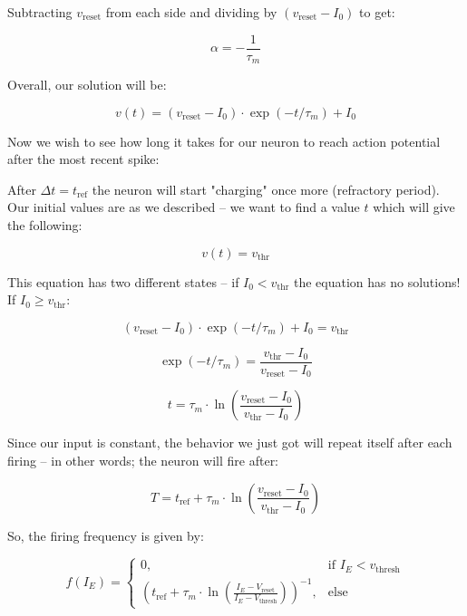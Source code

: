 Subtracting \( v_{\text{reset}} \) from each side and dividing by \( (v_{\text{reset}} - I_0) \) to get:

\begin{equation}
\alpha = -\frac{1}{\tau_m}
\end{equation}

Overall, our solution will be:

\begin{equation} \label{eq:general_sol}
v(t) = (v_{\text{reset}} - I_0) \cdot \exp(-t/\tau_m) + I_0
\end{equation}

Now we wish to see how long it takes for our neuron to reach action potential after the most recent spike:

After \( \Delta t = t_{\text{ref}} \) the neuron will start "charging" once more (refractory period). Our initial values are as we described – we want to find a value \( t \) which will give the following:

\begin{equation}
v(t) = v_{\text{thr}}
\end{equation}

This equation has two different states – if \( I_0 < v_{\text{thr}} \) the equation has no solutions! If \( I_0 \geq v_{\text{thr}} \):

\begin{equation}
(v_{\text{reset}} - I_0) \cdot \exp(-t/\tau_m) + I_0 = v_{\text{thr}}
\end{equation}

\begin{equation}
\exp(-t/\tau_m) = \frac{v_{\text{thr}} - I_0}{v_{\text{reset}} - I_0}
\end{equation}

\begin{equation}
t = \tau_m \cdot \ln\left(\frac{v_{\text{reset}} - I_0}{v_{\text{thr}} - I_0}\right)
\end{equation}

Since our input is constant, the behavior we just got will repeat itself after each firing – in other words; the neuron will fire after:

\begin{equation}
T = t_{\text{ref}} + \tau_m \cdot \ln\left(\frac{v_{\text{reset}} - I_0}{v_{\text{thr}} - I_0}\right)
\end{equation}

So, the firing frequency is given by:

\begin{equation}
f(I_E) = \begin{cases}
    0, & \text{if } I_E < v_{\text{thresh}} \\
    \left(t_{\text{ref}} + \tau_m \cdot \ln\left(\frac{I_E - V_{\text{reset}}}{I_E - V_{\text{thresh}}}\right)\right)^{-1}, & \text{else}
\end{cases}
\end{equation}

